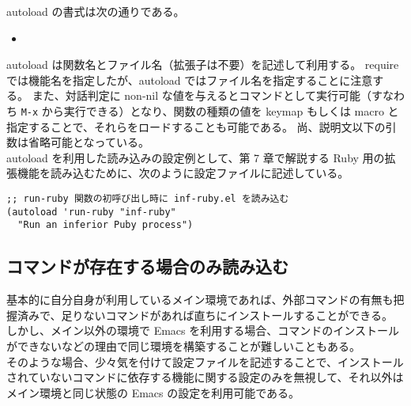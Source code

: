 autoload の書式は次の通りである。
\begin{itemize}\setlength{\leftskip}{-1.00zw}%
\item[]  \texttt{}
\end{itemize}
autoload は関数名とファイル名（拡張子は不要）を記述して利用する。
require では機能名を指定したが、autoload ではファイル名を指定することに注意する。
また、対話判定に non-nil な値を与えるとコマンドとして実行可能（すなわち \texttt{M-x} から実行できる）となり、関数の種類の値を keymap もしくは macro と指定することで、それらをロードすることも可能である。
尚、説明文以下の引数は省略可能となっている。\\

autoload を利用した読み込みの設定例として、第 7 章で解説する Ruby 用の拡張機能を読み込むために、次のように設定ファイルに記述している。
\begin{mdframed}[roundcorner=0.50zw,leftmargin=3.00zw,rightmargin=3.00zw,skipabove=0.40zw,skipbelow=0.40zw,innertopmargin=4.00pt,innerbottommargin=4.00pt,innerleftmargin=5.00pt,innerrightmargin=5.00pt,linecolor=gray!020,linewidth=0.50pt,backgroundcolor=gray!20]
\begin{verbatim}
;; run-ruby 関数の初呼び出し時に inf-ruby.el を読み込む
(autoload 'run-ruby "inf-ruby"
  "Run an inferior Puby process")
\end{verbatim}
\end{mdframed}
\subsection{コマンドが存在する場合のみ読み込む}
基本的に自分自身が利用しているメイン環境であれば、外部コマンドの有無も把握済みで、足りないコマンドがあれば直ちにインストールすることができる。
しかし、メイン以外の環境で Emacs を利用する場合、コマンドのインストールができないなどの理由で同じ環境を構築することが難しいこともある。\\

そのような場合、少々気を付けて設定ファイルを記述することで、インストールされていないコマンドに依存する機能に関する設定のみを無視して、それ以外はメイン環境と同じ状態の Emacs の設定を利用可能である。\\

